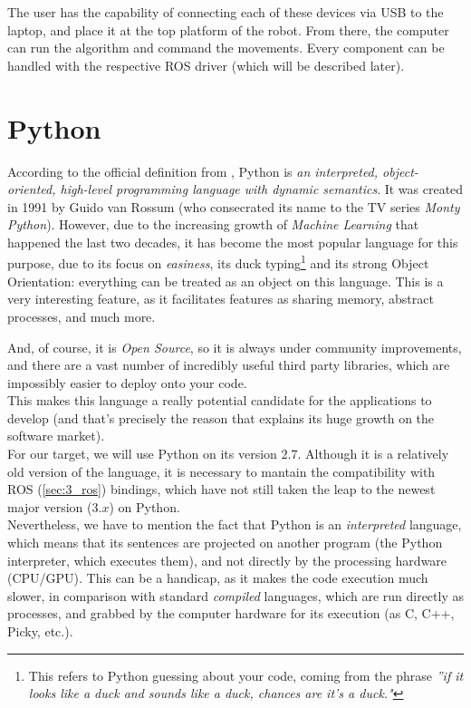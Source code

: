 		The user has the capability of connecting each of these devices via USB to the laptop, and place it at the top platform of the robot. From there, the computer can run the algorithm and command the movements. Every component can be handled with the respective ROS driver (which will be described later).
	

\section{Python}
	According to the official definition from \cite{python}, Python is \textit{an interpreted, object-oriented, high-level programming language with dynamic semantics}. It was created in 1991 by Guido van Rossum (who consecrated its name to the TV series \textit{Monty Python}). However, due to the increasing growth of \emph{Machine Learning} that happened the last two decades, it has become the most popular language for this purpose, due to its focus on \emph{easiness}, its duck typing\footnote{This refers to Python guessing about your code, coming from the phrase \textit{''if it looks like a duck and sounds like a duck, chances are it's a duck."}} and its strong Object Orientation: everything can be treated as an object on this language. This is a very interesting feature, as it facilitates features as sharing memory, abstract processes, and much more.
	
	And, of course, it is \textit{Open Source}, so it is always under community improvements, and there are a vast number of incredibly useful third party libraries, which are impossibly easier to deploy onto your code.\\
	
	This makes this language a really potential candidate for the applications to develop (and that's precisely the reason that explains its huge growth on the software market).\\
	
	For our target, we will use Python on its version $2.7$. Although it is a relatively old version of the language, it is necessary to mantain the compatibility with ROS (\autoref{sec:3_ros}) bindings, which have not still taken the leap to the newest major version ($3.x$) on Python.\\
	
	Nevertheless, we have to mention the fact that Python is an \emph{interpreted} language, which means that its sentences are projected on another program (the Python interpreter, which executes them), and not directly by the processing hardware (CPU/GPU). This can be a handicap, as it makes the code execution much slower, in comparison with standard \emph{compiled} languages, which are run directly as processes, and grabbed by the computer hardware for its execution (as C, C++, Picky, etc.).

